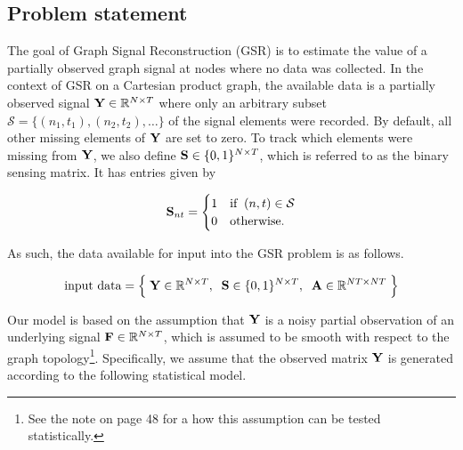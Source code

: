 \vspace*{\fill}




\newpage 

\subsection{Problem statement}

\label{sec:problem_statement_2d}

\addtolength{\skip\footins}{2pc plus 2pt}

The goal of Graph Signal Reconstruction (GSR) is to estimate the value of a partially observed graph signal at nodes where no data was collected. In the context of GSR on a Cartesian product graph, the available data is a partially  observed signal $\mathbf{Y} \in \mathbb{R}^{N \times T}$ where only an arbitrary subset $\mathcal{S} = \{(n_1, t_1), (n_2, t_2), \dots \}$ of the signal elements were recorded. By default, all other missing elements of $\mathbf{Y}$ are set to zero. To track which elements were missing from $\mathbf{Y}$, we also define $\mathbf{S} \in \{0, 1\}^{N \times T}$, which is referred to as the binary sensing matrix. It has entries given by

\begin{equation}
    \mathbf{S}_{nt} = \begin{cases}
        1 & \text{if} \;\; (n, t) \in \mathcal{S} \\
        0 & \text{otherwise.}
    \end{cases}
\end{equation}

As such, the data available for input into the GSR problem is as follows. 

\begin{equation*}
    \text{input data} = \Big\{\; \mathbf{Y} \in \mathbb{R}^{N \times T}, \;\; \mathbf{S} \in \{0, 1\}^{N \times T} , \;\; \mathbf{A} \in \mathbb{R}^{NT \times NT} \; \Big\}
\end{equation*}

Our model is based on the assumption that $\mathbf{Y}$ is a noisy partial observation of an underlying signal $\mathbf{F} \in \mathbb{R}^{N \times T}$, which is assumed to be smooth with respect to the graph topology\footnote{See the note on page 48 for a how this assumption can be tested statistically.}. Specifically, we assume that the observed matrix $\mathbf{Y}$ is generated according to the following statistical model. 

